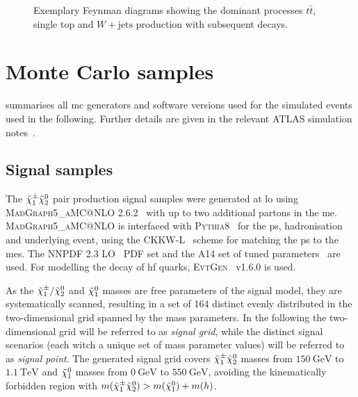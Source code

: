 \begin{figure}
\begin{subfigure}[b]{0.3\linewidth}
		\caption{\label{fig:wjets}}
	\end{subfigure}
	\caption{Exemplary Feynman diagrams showing the dominant processes  $t\bar{t}$,  single top and  $W+\textrm{jets}$ production with subsequent decays.}
	\label{fig:sm_backgrounds_feynman}
\end{figure}


\section{Monte Carlo samples}

 summarises all \gls{mc} generators and software versions used for the simulated events used in the following. Further details are given in the relevant ATLAS simulation notes~\cite{ATL-PHYS-PUB-2018-009,ATL-PHYS-PUB-2016-005,ATL-PHYS-PUB-2017-006,ATL-PHYS-PUB-2017-005,ATL-PHYS-PUB-2016-002}.

\subsection{Signal samples}

The $\tilde{\chi}_1^\pm\tilde{\chi}_2^0$ pair production signal samples were generated at \gls{lo} using \textsc{MadGraph5\_aMC@NLO} 2.6.2~\cite{MGaMCNLO:2014hca,Frederix:2012ps} with up to two additional partons in the \gls{me}. \textsc{MadGraph5\_aMC@NLO} is interfaced with \textsc{Pythia8}~\cite{Pythia8:2007gs} for the \gls{ps}, hadronisation and underlying event, using the CKKW-L~\cite{Lonnblad:2011xx} scheme for matching the \gls{ps} to the \glspl{me}. The NNPDF 2.3 LO~\cite{Ball:2012cx} \gls{PDF} set and the A14 set of tuned parameters~\cite{ATL-PHYS-PUB-2014-021} are used. For modelling the decay of \gls{hf} quarks, \textsc{EvtGen}~\cite{Lange:2001uf} v1.6.0 is used. 

As the $\tilde{\chi}_1^\pm/\tilde{\chi}_2^0$ and $\tilde{\chi}_1^0$ masses are free parameters of the signal model, they are systematically scanned, resulting in a set of 164 distinct evenly distributed in the two-dimensional grid spanned by the mass parameters. In the following the two-dimensional grid will be referred to as \textit{signal grid}, while the distinct signal scenarios (each witch a unique set of mass parameter values) will be referred to as \textit{signal point}. The generated signal grid covers $\tilde{\chi}_1^\pm\tilde{\chi}_2^0$ masses from $\SI{150}{\GeV}$ to $\SI{1.1}{\TeV}$ and $\tilde{\chi}_1^0$ masses from $\SI{0}{\GeV}$ to $\SI{550}{\GeV}$, avoiding the kinematically forbidden region with $m(\tilde{\chi}_1^\pm\tilde{\chi}_2^0) > m(\tilde{\chi}_1^0) + m(h)$.

